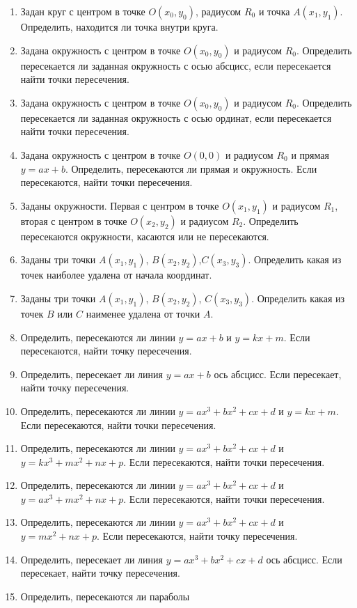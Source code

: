 \begin{enumerate}
\item Задан круг с центром в точке $O(x_0, y_0)$, радиусом $R_0$ и точка $A(x_1,y_1)$. 
Определить, находится ли точка внутри круга.
\item Задана окружность с центром в точке $O(x_0,y_0)$ и радиусом $R_0$. Определить пересекается ли
заданная окружность с осью абсцисс, если пересекается найти точки пересечения.
\item Задана окружность с центром в точке $O(x_0,y_0)$ и радиусом $R_0$. Определить пересекается ли
заданная окружность с осью ординат, если пересекается найти точки пересечения.
\item Задана окружность с центром в точке $O(0,0)$ и радиусом $R_0$ и
прямая $y=ax+b$. Определить, пересекаются ли прямая и
окружность. Если пересекаются, найти точки пересечения.
\item Заданы окружности. Первая с центром в точке $O(x_1,y_1)$ и радиусом
$R_1$, вторая с центром в точке $O(x_2,y_2)$ и радиусом
$R_2$. Определить пересекаются окружности, касаются или не пересекаются.
\item Заданы три точки
$A(x_1,y_1)$, $B(x_2,y_2)$,$C(x_3,y_3)$. Определить какая
из точек наиболее удалена от начала координат.
\item Заданы три точки $A(x_1,y_1)$, $B(x_2,y_2)$, $C(x_3,y_3)$. Определить какая
из точек $B$ или $C$ наименее удалена от точки $A$.
\item Определить, пересекаются ли линии $y=ax+b$ и
$y=kx+m$. Если пересекаются, найти точку пересечения.
\item Определить, пересекает ли линия $y=ax+b$ ось абсцисс. Если пересекает, найти точку пересечения.
\item Определить, пересекаются ли линии
$y=ax^3+bx^2+cx+d$ и $y=kx+m$. Если пересекаются, найти точки пересечения.
\item Определить, пересекаются ли линии
$y=ax^3+bx^2+cx+d$
и
$y=kx^3+mx^2+nx+p$.
Если пересекаются, найти точки пересечения.
\item Определить, пересекаются ли линии
$y=ax^3+bx^2+cx+d$
и
$y=ax^3+mx^2+nx+p$.
Если пересекаются, найти точки пересечения.
\item Определить, пересекаются ли линии
$y=ax^3+bx^2+cx+d$
и $y=mx^2+nx+p$. Если
пересекаются, найти точку пересечения.
\item Определить, пересекает ли линия
$y=ax^3+bx^2+cx+d$
ось абсцисс. Если пересекает, найти точку пересечения.
\item Определить, пересекаются ли параболы

\end{enumerate}
